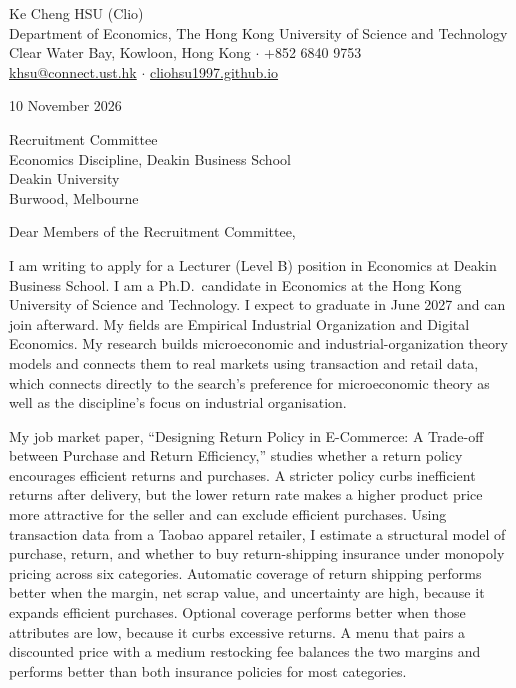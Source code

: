 \documentclass[11pt]{article}
\begin{document}
\begin{flushleft}
Ke Cheng HSU (Clio) \\
Department of Economics, The Hong Kong University of Science and Technology \\
Clear Water Bay, Kowloon, Hong Kong $\cdot$ +852 6840 9753 \\
\href{mailto:khsu@connect.ust.hk}{khsu@connect.ust.hk} $\cdot$ \href{https://cliohsu1997.github.io/}{cliohsu1997.github.io}
\end{flushleft}

10 November 2026

\vspace{0.12em}
Recruitment Committee \\
Economics Discipline, Deakin Business School \\
Deakin University \\
Burwood, Melbourne

\vspace{0.12em}
Dear Members of the Recruitment Committee,

I am writing to apply for a Lecturer (Level B) position in Economics at Deakin Business School. I am a Ph.D.\ candidate in Economics at the Hong Kong University of Science and Technology. I expect to graduate in June 2027 and can join afterward. My fields are Empirical Industrial Organization and Digital Economics. My research builds microeconomic and industrial-organization theory models and connects them to real markets using transaction and retail data, which connects directly to the search's preference for microeconomic theory as well as the discipline's focus on industrial organisation.

My job market paper, ``Designing Return Policy in E-Commerce: A Trade-off between Purchase and Return Efficiency,'' studies whether a return policy encourages efficient returns and purchases. A stricter policy curbs inefficient returns after delivery, but the lower return rate makes a higher product price more attractive for the seller and can exclude efficient purchases. Using transaction data from a Taobao apparel retailer, I estimate a structural model of purchase, return, and whether to buy return-shipping insurance under monopoly pricing across six categories. Automatic coverage of return shipping performs better when the margin, net scrap value, and uncertainty are high, because it expands efficient purchases. Optional coverage performs better when those attributes are low, because it curbs excessive returns. A menu that pairs a discounted price with a medium restocking fee balances the two margins and performs better than both insurance policies for most categories.
\end{document}
